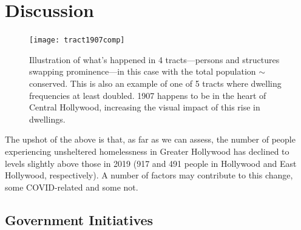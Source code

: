\documentclass[11pt,twocolumn]{article}
\def\resp{respectively}
\begin{document}
%
%
%

\section{Discussion}
\label{sec:discussion}

\begin{figure}[t]
	\centering
	\texttt{[image: tract1907comp]}
	\caption{Illustration of what's happened in 4 tracts---persons and structures
			swapping prominence---in this case with the total population
			$\sim$conserved. This is also an example of one of 5 tracts where
			dwelling frequencies at least doubled. 1907 happens to be in the 
			heart of Central Hollywood, increasing the visual impact of this
			rise in dwellings.}
	\label{fig:1907}
\end{figure}

The upshot of the above is that, as far as we can assess, the number of people experiencing unsheltered
homelessness in Greater Hollywood has declined to levels slightly above those in 2019 (917 and 491 people in 
Hollywood and East Hollywood, \resp). A number of factors may contribute to this change, some 
COVID-related and some not.

\subsection{Government Initiatives}
\end{document}

